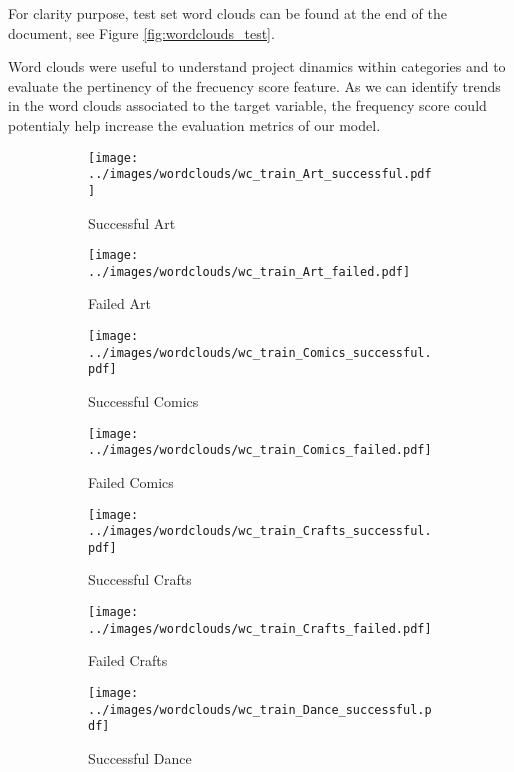 \documentclass{article}
\begin{document}
\begin{itemize}
For clarity purpose, test set word clouds can be found at the end of the document, see Figure \ref{fig:wordclouds_test}.

Word clouds were useful to understand project dinamics within categories and to evaluate the pertinency of the frecuency score feature. As we can identify trends in the word clouds associated to the target variable, the frequency score could potentialy help increase the evaluation metrics of our model.

\begin{figure}
  \begin{subfigure}[a]{0.2\linewidth}
    \centering\texttt{[image: ../images/wordclouds/wc\_train\_Art\_successful.pdf]}
    \caption{Successful Art}
    \label{fig:Art_s}
  \end{subfigure}
  \begin{subfigure}[a']{0.2\linewidth}
    \centering\texttt{[image: ../images/wordclouds/wc\_train\_Art\_failed.pdf]}
    \caption{Failed Art}
    \label{fig:Art_f}
  \end{subfigure}
  \begin{subfigure}[b]{0.2\linewidth}
    \centering\texttt{[image: ../images/wordclouds/wc\_train\_Comics\_successful.pdf]}
    \caption{Successful Comics}
    \label{fig:Comic_s}
  \end{subfigure} 
  \begin{subfigure}[b']{0.2\linewidth}
    \centering\texttt{[image: ../images/wordclouds/wc\_train\_Comics\_failed.pdf]}
    \caption{Failed Comics}
    \label{fig:Comic_f}
  \end{subfigure}
  \begin{subfigure}[c]{0.2\linewidth}
    \centering\texttt{[image: ../images/wordclouds/wc\_train\_Crafts\_successful.pdf]}
    \caption{Successful Crafts}
    \label{fig:Crafts_s}
  \end{subfigure}
    \begin{subfigure}[c']{0.2\linewidth}
    \centering\texttt{[image: ../images/wordclouds/wc\_train\_Crafts\_failed.pdf]}
    \caption{Failed Crafts}
    \label{fig:Crafts_f}
  \end{subfigure}
    \begin{subfigure}[d]{0.2\linewidth}
    \centering\texttt{[image: ../images/wordclouds/wc\_train\_Dance\_successful.pdf]}
    \caption{Successful Dance}
    \label{fig:Dance_s}
  \end{subfigure}
    \begin{subfigure}[d']{0.2\linewidth}

\end{subfigure}
\end{figure}
\end{itemize}
\end{document}
